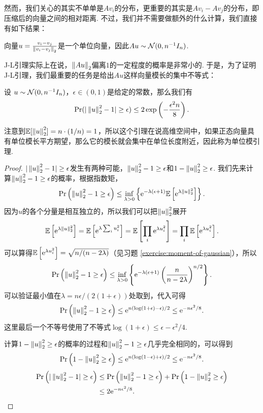 然而，我们关心的其实不单单是$Av_i$的分布，更重要的其实是$Av_i-Av_j$的分布，即压缩后的向量之间的相对距离. 不过，我们并不需要做额外的什么计算，我们直接有如下结果：

\begin{lemma}\label{lemma:gaussian-vector-diff}
    向量$u=\frac{v_i-v_j}{\left\|v_i-v_j\right\|_2}$是一个单位向量，因此$Au\sim \mathcal{N}(0,n^{-1}I_n)$.
\end{lemma}

J-L引理实际上在说，$\left\|Au\right\|_2$偏离$1$的一定程度的概率是非常小的. 于是，为了证明J-L引理，我们最重要的任务是给出$Au$这样向量模长的集中不等式：
\begin{lemma}[单位模引理]\label{lemma:unit-mod-lemma}
    设 $u\sim \mathcal{N}(0,n^{-1}I_n)$，$\epsilon \in (0,1 )$是给定的常数，那么我们有
    \[
        \Pr(|\left\|u\right\|_2^2 - 1| \geq \epsilon) \leq 2\exp \left(-\frac{\epsilon^2 n}{8}\right).
    \]
\end{lemma}
注意到$\mathbb{E}[\left\|u\right\|_2^2]=n\cdot(1/n)=1$，所以这个引理在说高维空间中，如果正态向量具有单位模长平方期望，那么它的模长就会集中在单位长度附近，因此称为单位模引理.

\begin{proof}
$|\left\|u\right\|_2^2 - 1| \geq \epsilon$发生有两种可能，$ \left\|u\right\|_2^2 - 1 \geq \epsilon$和$ 1 - \left\|u\right\|_2^2 \geq \epsilon$. 我们先来计算$ \left\|u\right\|_2^2 - 1 \geq \epsilon$的概率，根据指数矩，
    \[
    \Pr\left(\left\|u\right\|_2^2 - 1 \geq \epsilon\right) \leq \inf_{\lambda > 0} \left\{\mathrm{e}^{- \lambda (\epsilon + 1)} \mathbb{E} \left[\mathrm{e}^{\lambda \left\|u\right\|_2^2}\right]\right\}. 
    \]
因为$u$的各个分量是相互独立的，所以我们可以把$\left\|u\right\|_2^2$展开
    \[
    \mathbb{E}\left[\mathrm{e}^{\lambda \left\|u\right\|_2^2}\right] = \mathbb{E}\left[\mathrm{e}^{\lambda \sum_i u_i^2}\right] = \mathbb{E}\left[\prod_i \mathrm{e}^{\lambda u_i^2}\right] = \prod_i \mathbb{E}\left[\mathrm{e}^{\lambda u_i^2}\right]. 
    \]
可以算得$\mathbb{E}\left[\mathrm{e}^{\lambda u_i^2}\right]= \sqrt{n/(n-2\lambda)}$（见习题 \ref{exercise:moment-of-gaussian}），所以
    \[
    \Pr\left(\left\|u\right\|_2^2 - 1 \geq \epsilon\right) \leq \inf_{\lambda > 0} \left\{\mathrm{e}^{- \lambda (\epsilon + 1)} \left(\frac{n}{n-2\lambda} \right)^{n/2}\right\}. 
    \]
可以验证最小值在$\lambda = n\epsilon/(2(1+\epsilon))$处取到，代入可得
    \[
    \Pr\left(\left\|u\right\|_2^2 - 1 \geq \epsilon\right) \leq \mathrm{e}^{n(\log (1+\epsilon) - \epsilon)/2} \leq \mathrm{e}^{-n\epsilon^2/8}. 
    \]
这里最后一个不等号使用了不等式$\log(1+\epsilon)\leq\epsilon-\epsilon^2/4$. 

计算$1 - \left\|u\right\|_2^2 \geq \epsilon$的概率的过程和$\left\|u\right\|_2^2 - 1 \geq \epsilon$几乎完全相同的，可以得到
    \[
    \Pr\left(1 - \left\|u\right\|_2^2 \geq \epsilon\right) \leq \mathrm{e}^{n(\log (1-\epsilon) + \epsilon)/2} \leq \mathrm{e}^{-n\epsilon^2/8}. 
    \]
    \begin{align*}
        \Pr\left(| \left\|u\right\|_2^2 - 1| \geq \epsilon\right) &\leq \Pr\left(\left\|u\right\|_2^2 - 1 \geq \epsilon\right) + \Pr\left(1 - \left\|u\right\|_2^2 \geq \epsilon\right) \\
        &\leq 2\mathrm{e}^{-n\epsilon^2/8}. 
    \end{align*}
\end{proof}

